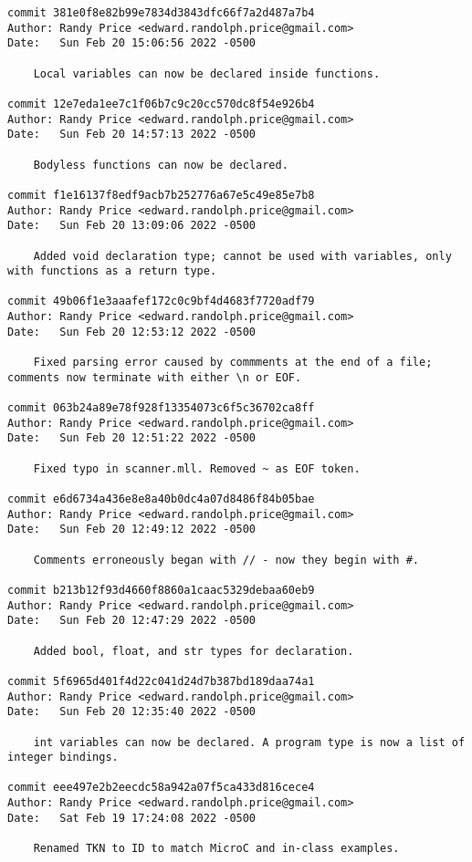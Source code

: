 {\begin{verbatim}
commit 381e0f8e82b99e7834d3843dfc66f7a2d487a7b4
Author: Randy Price <edward.randolph.price@gmail.com>
Date:   Sun Feb 20 15:06:56 2022 -0500

    Local variables can now be declared inside functions.

commit 12e7eda1ee7c1f06b7c9c20cc570dc8f54e926b4
Author: Randy Price <edward.randolph.price@gmail.com>
Date:   Sun Feb 20 14:57:13 2022 -0500

    Bodyless functions can now be declared.

commit f1e16137f8edf9acb7b252776a67e5c49e85e7b8
Author: Randy Price <edward.randolph.price@gmail.com>
Date:   Sun Feb 20 13:09:06 2022 -0500

    Added void declaration type; cannot be used with variables, only with functions as a return type.

commit 49b06f1e3aaafef172c0c9bf4d4683f7720adf79
Author: Randy Price <edward.randolph.price@gmail.com>
Date:   Sun Feb 20 12:53:12 2022 -0500

    Fixed parsing error caused by commments at the end of a file; comments now terminate with either \n or EOF.

commit 063b24a89e78f928f13354073c6f5c36702ca8ff
Author: Randy Price <edward.randolph.price@gmail.com>
Date:   Sun Feb 20 12:51:22 2022 -0500

    Fixed typo in scanner.mll. Removed ~ as EOF token.

commit e6d6734a436e8e8a40b0dc4a07d8486f84b05bae
Author: Randy Price <edward.randolph.price@gmail.com>
Date:   Sun Feb 20 12:49:12 2022 -0500

    Comments erroneously began with // - now they begin with #.

commit b213b12f93d4660f8860a1caac5329debaa60eb9
Author: Randy Price <edward.randolph.price@gmail.com>
Date:   Sun Feb 20 12:47:29 2022 -0500

    Added bool, float, and str types for declaration.

commit 5f6965d401f4d22c041d24d7b387bd189daa74a1
Author: Randy Price <edward.randolph.price@gmail.com>
Date:   Sun Feb 20 12:35:40 2022 -0500

    int variables can now be declared. A program type is now a list of integer bindings.

commit eee497e2b2eecdc58a942a07f5ca433d816cece4
Author: Randy Price <edward.randolph.price@gmail.com>
Date:   Sat Feb 19 17:24:08 2022 -0500

    Renamed TKN to ID to match MicroC and in-class examples.


\end{verbatim}}
